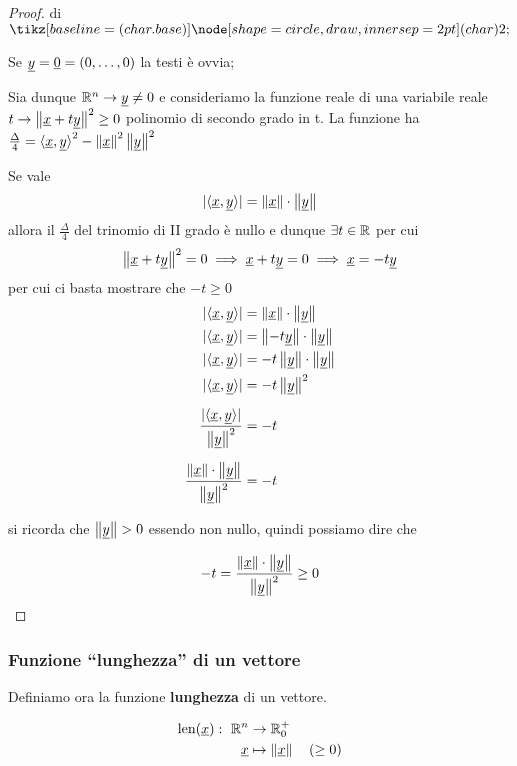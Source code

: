 \begin{proof} di \(\circled{2}\)

    Se \(\uy = \uzero = (0, \ldots ,0)\) la testi è ovvia;

    Sia dunque \(\Rn  \rightarrow \uy \neq 0\) e consideriamo la funzione reale di una variabile reale \(t \rightarrow \norm{\ux+t\uy}^{2}\ge 0\) polinomio di secondo grado in t.
    La funzione ha \(\frac{\Delta}{4} = {\prods{\ux}{\uy}}^{2} - \norm\ux^{2}\norm\uy^{2}\)

    \medskip

    Se vale
    \[|\prods{\ux}{\uy}| = \norm\ux \cdot \norm\uy \]
    allora il \(\frac{\Delta}{4}\) del trinomio di II grado è nullo e dunque \(\exists t \in \R \) per cui
    \[\norm{\ux+t\uy}^{2}=0 \implies \ux +t\uy=0 \implies \ux=-t\uy \]
    per cui ci basta mostrare che \(-t \ge 0\)
    \begin{align*}
        |\prods{\ux}{\uy}| & = \norm\ux \cdot \norm\uy \\
        |\prods{\ux}{\uy}| & = \norm{-t\uy} \cdot \norm\uy \\
        |\prods{\ux}{\uy}| & = -t\norm{\uy} \cdot \norm\uy \\
        |\prods{\ux}{\uy}| & = -t\norm\uy^{2} \\[2mm]
        \frac{|\prods{\ux}{\uy}|}{\norm\uy^{2}} & = -t \\[2mm]
        \frac{\norm\ux \cdot \norm\uy}{\norm\uy^{2}} & = -t
    \end{align*}

    si ricorda che \(\norm\uy>0\) essendo \uy{} non nullo, quindi possiamo dire che

    \[
        -t = \frac{\norm\ux \cdot \norm\uy}{\norm\uy^{2}} \ge 0
    \]

\end{proof}

\filbreak{}

\subsubsection{Funzione ``lunghezza'' di un vettore}

Definiamo ora la funzione \textbf{lunghezza} di un vettore.

\begin{align*}
    \text{len}(\ux): \ \Rn & \rightarrow \R_0^{+}            \\
    \ux                    & \mapsto \norm\ux \quad (\geq 0)
\end{align*}

